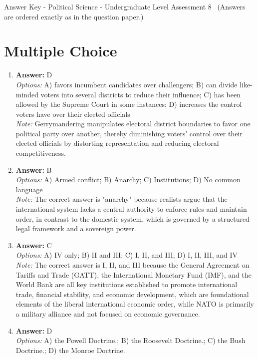 \documentclass[12pt]{article}
\begin{document}
\begin{center}
Answer Key - Political Science - Undergraduate Level Assessment 8 \
\small (Answers are ordered exactly as in the question paper.)
\end{center}

\section*{Multiple Choice}
\begin{enumerate}[label=\arabic*.]
\item \textbf{Answer:} D
\\ \textit{Options:} A) favors incumbent candidates over challengers; B) can divide like-minded voters into several districts to reduce their influence; C) has been allowed by the Supreme Court in some instances; D) increases the control voters have over their elected officials
\\ \textit{Note:} Gerrymandering manipulates electoral district boundaries to favor one political party over another, thereby diminishing voters' control over their elected officials by distorting representation and reducing electoral competitiveness.
\item \textbf{Answer:} B
\\ \textit{Options:} A) Armed conflict; B) Anarchy; C) Institutions; D) No common language
\\ \textit{Note:} The correct answer is "anarchy" because realists argue that the international system lacks a central authority to enforce rules and maintain order, in contrast to the domestic system, which is governed by a structured legal framework and a sovereign power.
\item \textbf{Answer:} C
\\ \textit{Options:} A) IV only; B) II and III; C) I, II, and III; D) I, II, III, and IV
\\ \textit{Note:} The correct answer is I, II, and III because the General Agreement on Tariffs and Trade (GATT), the International Monetary Fund (IMF), and the World Bank are all key institutions established to promote international trade, financial stability, and economic development, which are foundational elements of the liberal international economic order, while NATO is primarily a military alliance and not focused on economic governance.
\item \textbf{Answer:} D
\\ \textit{Options:} A) the Powell Doctrine.; B) the Roosevelt Doctrine.; C) the Bush Doctrine.; D) the Monroe Doctrine.

\end{enumerate}
\end{document}
